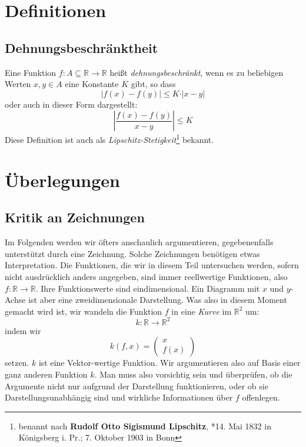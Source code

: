 \section{Definitionen}

\subsection{Dehnungsbeschränktheit}

\begin{definition}
Eine Funktion $f : A \subseteq \mathbb{R} \longrightarrow \mathbb{R}$ heißt \textsl{dehnungsbeschränkt}, wenn es zu beliebigen Werten $x,y\in A$ eine Konstante $K$ gibt, so dass
\[
\left\vert f(x)-f(y)  \right\vert \le K\cdot \vert x-y \vert
\]
oder auch in dieser Form dargestellt:
\[
\left\vert \frac{f(x)-f(y)}{x-y}  \right\vert \le K
\]
Diese Definition ist auch als \textsl{Lipschitz-Stetigkeit}\footnote{benannt nach \textbf{Rudolf Otto Sigismund Lipschitz}, *14. Mai 1832 in Königsberg i. Pr.; 7. Oktober 1903 in Bonn} bekannt.
\end{definition}


\section{Überlegungen}


\subsection{Kritik an Zeichnungen}

Im Folgenden werden wir öfters anschaulich argumentieren, gegebenenfalls unterstützt durch eine Zeichnung. Solche Zeichnungen benötigen etwas Interpretation. Die Funktionen, die wir in diesem Teil untersuchen werden, sofern nicht ausdrücklich anders angegeben, sind immer reellwertige Funktionen, also $f:\mathbb{R} \longrightarrow \mathbb{R}$. Ihre Funktionswerte sind eindimensional. Ein Diagramm mit $x$ und $y$-Achse ist aber eine zweidimensionale Darstellung. Was also in diesem Moment gemacht wird ist, wir wandeln die Funktion $f$ in eine \textsl{Kurve} im $\mathbb{R}^2$ um:
\[
k : \mathbb{R} \longrightarrow \mathbb{R}^2
\]
indem wir 
\[
k(f,x) = \begin{pmatrix}
x \\
f(x)
\end{pmatrix}
\]
setzen. $k$ ist eine Vektor-wertige Funktion. Wir argumentieren also auf Basis einer ganz anderen Funktion $k$. Man muss also vorsichtig sein und überprüfen, ob die Argumente nicht nur aufgrund der Darstellung funktionieren, oder ob sie Darstellungsunabhängig sind und wirkliche Informationen über $f$ offenlegen. 

